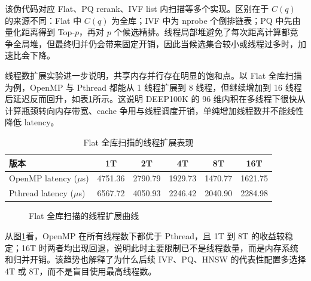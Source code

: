 \documentclass[a4paper]{article}
\begin{document}
该伪代码对应 Flat、PQ rerank、IVF list 内扫描等多个实现。区别在于 $C(q)$ 的来源不同：Flat 中 $C(q)$ 为全库；IVF 中为 nprobe 个倒排链表；PQ 中先由量化距离得到 Top-$p$，再对 $p$ 个候选精排。线程局部堆避免了每次距离计算都竞争全局堆，但最终归并仍会带来固定开销，因此当候选集合较小或线程过多时，加速比会下降。

线程数扩展实验进一步说明，共享内存并行存在明显的饱和点。以 Flat 全库扫描为例，OpenMP 与 Pthread 都能从 1 线程扩展到 8 线程，但继续增加到 16 线程后延迟反而回升，如表\ref{tab:thread-scaling}所示。这说明 DEEP100K 的 96 维内积在多线程下很快从计算瓶颈转向内存带宽、cache 争用与线程调度开销，单纯增加线程数并不能线性降低 latency。

\begin{table}[H]
\centering
\small
\caption{Flat 全库扫描的线程扩展表现}
\label{tab:thread-scaling}
\begin{tabular}{lccccc}
\toprule
版本 & 1T & 2T & 4T & 8T & 16T \\
\midrule
OpenMP latency ($\mu$s) & 4751.36 & 2790.79 & 1929.73 & 1470.77 & 1621.75 \\
Pthread latency ($\mu$s) & 6567.72 & 4050.93 & 2246.42 & 2040.90 & 2284.98 \\
\bottomrule
\end{tabular}
\end{table}

\begin{figure}[H]
\centering
{}
\caption{Flat 全库扫描的线程扩展曲线}
\label{fig:thread-scaling}
\end{figure}

从图\ref{fig:thread-scaling}看，OpenMP 在所有线程数下都优于 Pthread，且 1T 到 8T 的收益较稳定；16T 时两者均出现回退，说明此时主要限制已不是线程数量，而是内存系统和归并开销。该趋势也解释了为什么后续 IVF、PQ、HNSW 的代表性配置多选择 4T 或 8T，而不是盲目使用最高线程数。
\end{document}
